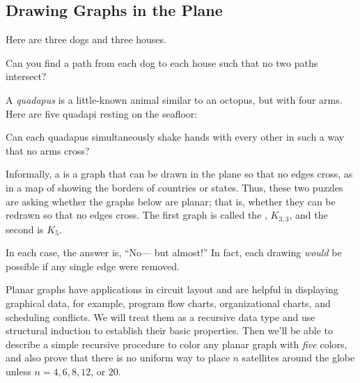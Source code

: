 \newcommand{\embed}[1]{\mathcal{#1}}  %

\label{planarsec}

\subsection{Drawing Graphs in the Plane}

Here are three dogs and three houses.

\begin{center}

\end{center}


Can you find a path from each dog to each house such that no
two paths intersect?

A \textit{quadapus} is a little-known animal similar to an octopus,
but with four arms.  Here are five quadapi resting on the seafloor:


\begin{center}

\end{center}

Can each quadapus simultaneously shake hands with every other in such a
way that no arms cross?

Informally, a  is a graph that can be drawn in the
plane so that no edges cross, as in a map of showing the borders of
countries or states.  Thus, these two puzzles are asking whether the
graphs below are planar; that is, whether they can be redrawn so that no
edges cross.  The first graph is called the , $K_{3,3}$, and the second is $K_5$.

\begin{center}

\end{center}

In each case, the answer is, ``No--- but almost!''  In fact, each drawing
\textit{would} be possible if any single edge were removed.

Planar graphs have applications in circuit layout and are helpful in
displaying graphical data, for example, program flow charts, organizational
charts, and scheduling conflicts.  We will treat them as a recursive data
type and use structural induction to establish their basic properties.
Then we'll be able to describe a simple recursive procedure to color any
planar graph with \emph{five} colors, and also prove that there is no
uniform way to place $n$ satellites around the globe unless $n = 4,6,8,12$,
or $20$.

